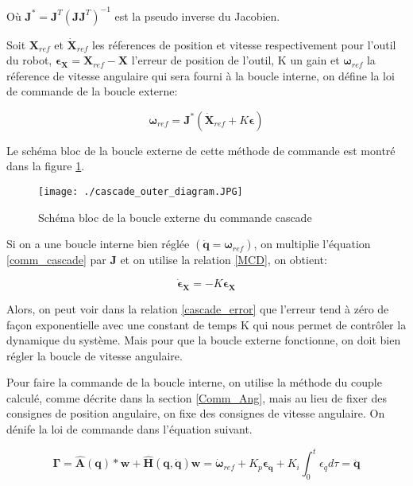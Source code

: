 Où $ \bm{J}^{\ast} = \bm{J}^T(\bm{J}\bm{J}^T)^{-1} $ est la pseudo inverse du Jacobien. 

Soit $ \bm{X}_{ref} $ et $ \bm{\dot{X}}_{ref} $ les réferences de position et vitesse respectivement pour l'outil du robot, $ \bm{\epsilon_X} =  \bm{X}_{ref} - \bm{X} $ l'erreur de position de l'outil, K un gain et $ \bm{\omega}_{ref} $ la réference de vitesse angulaire qui sera fourni à la boucle interne, on défine la loi de commande de la boucle externe:

\begin{equation}
	\bm{\omega}_{ref} = \bm{J}^{\ast}(\bm{\dot{X}}_{ref} + K\bm{\epsilon})
	\label{comm_cascade}
\end{equation}

Le schéma bloc de la boucle externe de cette méthode de commande est montré dans la figure \ref{fig:cascade_outer_diagram}.

\begin{figure}[H]
	\begin{center}	
		\captionsetup{justification=centering,margin=1cm}
		\texttt{[image: ./cascade\_outer\_diagram.JPG]}
		\caption{Schéma bloc de la boucle externe du commande cascade}
		\label{fig:cascade_outer_diagram}
	\end{center}
\end{figure}

Si on a une boucle interne bien réglée $ (\bm{\dot{q}} = \bm{\omega}_{ref}) $, on multiplie l'équation \ref{comm_cascade} par $ \bm{J} $ et on utilise la relation \ref{MCD}, on obtient:

\begin{equation}
	\bm{\dot{\epsilon}_X} = - K\bm{\epsilon_X}
	\label{cascade_error}
\end{equation}

Alors, on peut voir dans la relation \ref{cascade_error} que l'erreur tend à zéro de façon exponentielle avec une constant de temps K qui nous permet de contrôler la dynamique du système. Mais pour que la boucle externe fonctionne, on doit bien régler la boucle de vitesse angulaire.

Pour faire la commande de la boucle interne, on utilise la méthode du couple calculé, comme décrite dans la section \ref{Comm_Ang}, mais au lieu de fixer des consignes de position angulaire, on fixe des consignes de vitesse angulaire. On dénife la loi de commande dans l'équation suivant.

\begin{subequations}
	\begin{equation}
		\bm{\Gamma} = \bm{\hat{A}}(\bm{q})*\bm{w} + \hat{\bm{H}}(\bm{q},\dot{\bm{q}})
	\end{equation}
	\begin{equation}
		\bm{w} = \bm{\dot{\omega}}_{ref} + K_p\bm{\epsilon_{\dot{q}}} + K_i\int_0^t {\epsilon_{\dot{q}}}d\tau = \bm{\ddot{q}}
	\end{equation}
\end{subequations}

